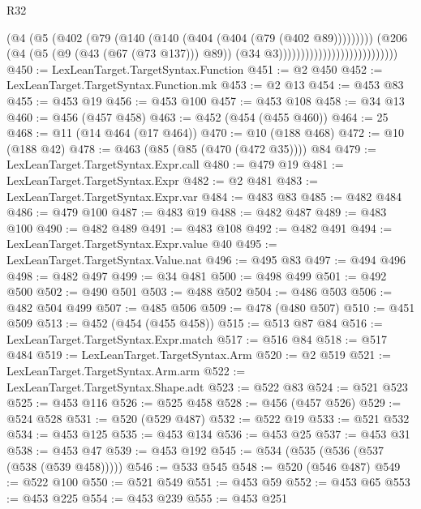 \begin{lexlean}{R32}
\begin{coremodule}
{{{{{{{{{{{{{{{{{{{{{{{{{{{{{{{{{{{{{{{{{{{{{{{{{{{                                                  (@4
                                                    (@5
                                                      (@402
                                                        (@79
                                                          (@140
                                                            (@140
                                                              (@404 (@404 (@79 (@402 @89)))))))))
                                                    (@206
                                                      (@4
                                                        (@5 (@9 (@43 (@67 (@73 @137))) @89))
                                                        (@34 @3)))))))))))))))))))))))))))
@450 := LexLeanTarget.TargetSyntax.Function
@451 := @2 @450
@452 := LexLeanTarget.TargetSyntax.Function.mk
@453 := @2 @13
@454 := @453 @83
@455 := @453 @19
@456 := @453 @100
@457 := @453 @108
@458 := @34 @13
@460 := @456 (@457 @458)
@463 := @452 (@454 (@455 @460))
@464 := 25
@468 := @11 (@14 @464 (@17 @464))
@470 := @10 (@188 @468)
@472 := @10 (@188 @42)
@478 := @463 (@85 (@85 (@470 (@472 @35)))) @84
@479 := LexLeanTarget.TargetSyntax.Expr.call
@480 := @479 @19
@481 := LexLeanTarget.TargetSyntax.Expr
@482 := @2 @481
@483 := LexLeanTarget.TargetSyntax.Expr.var
@484 := @483 @83
@485 := @482 @484
@486 := @479 @100
@487 := @483 @19
@488 := @482 @487
@489 := @483 @100
@490 := @482 @489
@491 := @483 @108
@492 := @482 @491
@494 := LexLeanTarget.TargetSyntax.Expr.value @40
@495 := LexLeanTarget.TargetSyntax.Value.nat
@496 := @495 @83
@497 := @494 @496
@498 := @482 @497
@499 := @34 @481
@500 := @498 @499
@501 := @492 @500
@502 := @490 @501
@503 := @488 @502
@504 := @486 @503
@506 := @482 @504 @499
@507 := @485 @506
@509 := @478 (@480 @507)
@510 := @451 @509
@513 := @452 (@454 (@455 @458))
@515 := @513 @87 @84
@516 := LexLeanTarget.TargetSyntax.Expr.match
@517 := @516 @84
@518 := @517 @484
@519 := LexLeanTarget.TargetSyntax.Arm
@520 := @2 @519
@521 := LexLeanTarget.TargetSyntax.Arm.arm
@522 := LexLeanTarget.TargetSyntax.Shape.adt
@523 := @522 @83
@524 := @521 @523
@525 := @453 @116
@526 := @525 @458
@528 := @456 (@457 @526)
@529 := @524 @528
@531 := @520 (@529 @487)
@532 := @522 @19
@533 := @521 @532
@534 := @453 @125
@535 := @453 @134
@536 := @453 @25
@537 := @453 @31
@538 := @453 @47
@539 := @453 @192
@545 := @534 (@535 (@536 (@537 (@538 (@539 @458)))))
@546 := @533 @545
@548 := @520 (@546 @487)
@549 := @522 @100
@550 := @521 @549
@551 := @453 @59
@552 := @453 @65
@553 := @453 @225
@554 := @453 @239
@555 := @453 @251
}}}}}}}}}}}}}}}}}}}}}}}}}}}}}}}}}}}}}}}}}}}}}}}}}}}
\end{coremodule}
\end{lexlean}
